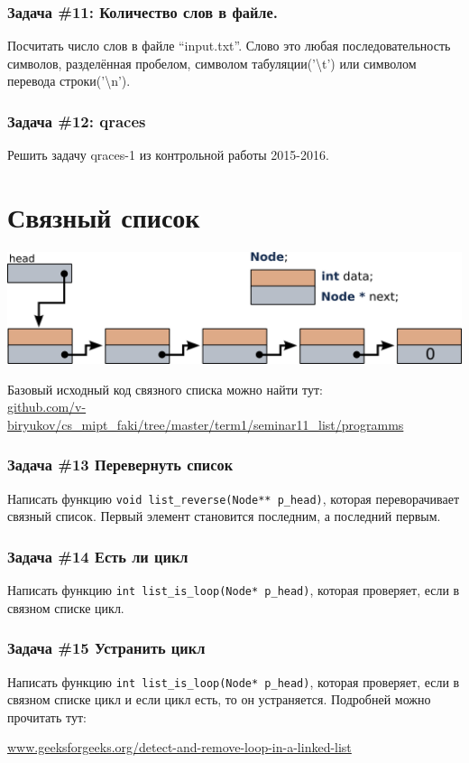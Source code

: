 \documentclass{article}
\begin{document}
\subsubsection*{\Squarepipe \quad Задача \#11: Количество слов в файле.}
Посчитать число слов в файле ``input.txt''. Слово это любая последовательность символов, разделённая пробелом, символом табуляции('\textbackslash t') или символом перевода строки('\textbackslash n').

\subsubsection*{\Bat \quad Задача \#12: qraces}
Решить задачу qraces-1 из контрольной работы 2015-2016.

\section*{Связный список}
\begin{center}
\includegraphics[width=0.6\linewidth]{list_initial.png}\\
\end{center}
Базовый исходный код связного списка можно найти тут:\\
\href{https://github.com/v-biryukov/cs_mipt_faki/tree/master/term1/seminar11_list/programms}{github.com/v-biryukov/cs\_mipt\_faki/tree/master/term1/seminar11\_list/programms}

\subsubsection*{\Squarepipe \quad Задача \#13 Перевернуть список}
Написать функцию \texttt{void list\_reverse(Node** p\_head)}, которая переворачивает связный список. Первый элемент становится последним, а последний первым. 

\subsubsection*{\Bat \quad Задача \#14 Есть ли цикл}
Написать функцию \texttt{int list\_is\_loop(Node* p\_head)}, которая проверяет, если в связном списке цикл.

\subsubsection*{\Bat \quad Задача \#15 Устранить цикл}
Написать функцию \texttt{int list\_is\_loop(Node* p\_head)}, которая проверяет, если в связном списке цикл и если цикл есть, то он устраняется. Подробней можно прочитать тут:

\href{http://www.geeksforgeeks.org/detect-and-remove-loop-in-a-linked-list/}{www.geeksforgeeks.org/detect-and-remove-loop-in-a-linked-list}
\end{document}

